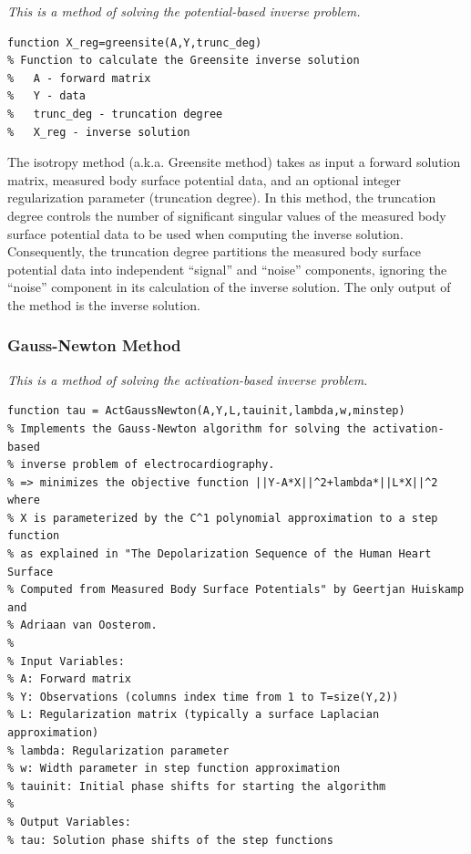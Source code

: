 \vspace{5pt}\textit{This is a method of solving the potential-based inverse problem.}\vspace{5pt}

\begin{verbatim}
function X_reg=greensite(A,Y,trunc_deg)
% Function to calculate the Greensite inverse solution
%   A - forward matrix
%   Y - data
%   trunc_deg - truncation degree
%   X_reg - inverse solution
\end{verbatim}

The isotropy method (a.k.a. Greensite method) takes as input a forward solution matrix, measured body surface potential data, and an optional integer regularization parameter (truncation degree). In this method, the truncation degree controls the number of significant singular values of the measured body surface potential data to be used when computing the inverse solution. Consequently, the truncation degree partitions the measured body surface potential data into independent ``signal'' and ``noise'' components, ignoring the ``noise'' component in its calculation of the inverse solution. The only output of the method is the inverse solution.

\subsubsection{Gauss-Newton Method}

\vspace{5pt}\textit{This is a method of solving the activation-based inverse problem.}\vspace{5pt}

\begin{verbatim}
function tau = ActGaussNewton(A,Y,L,tauinit,lambda,w,minstep)
% Implements the Gauss-Newton algorithm for solving the activation-based
% inverse problem of electrocardiography.
% => minimizes the objective function ||Y-A*X||^2+lambda*||L*X||^2 where
% X is parameterized by the C^1 polynomial approximation to a step function
% as explained in "The Depolarization Sequence of the Human Heart Surface
% Computed from Measured Body Surface Potentials" by Geertjan Huiskamp and
% Adriaan van Oosterom.
%
% Input Variables:
% A: Forward matrix
% Y: Observations (columns index time from 1 to T=size(Y,2))
% L: Regularization matrix (typically a surface Laplacian approximation)
% lambda: Regularization parameter
% w: Width parameter in step function approximation
% tauinit: Initial phase shifts for starting the algorithm
%
% Output Variables:
% tau: Solution phase shifts of the step functions
\end{verbatim}

